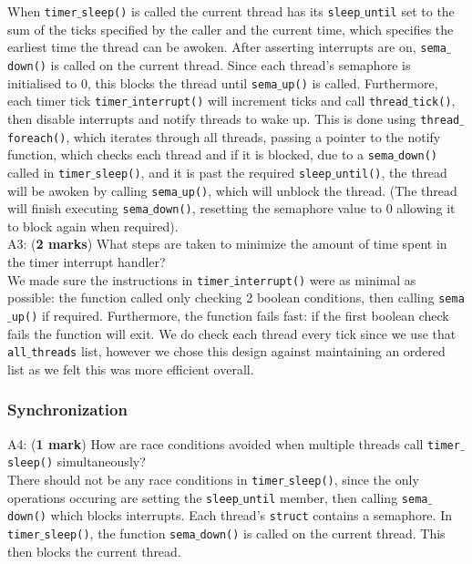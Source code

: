 \documentclass[a4paper,12pt]{article}
\begin{document}
When \texttt{timer$\_$sleep()} is called the current thread has its \texttt{sleep$\_$until} set to the sum of the ticks specified by the caller and the current time, which specifies the earliest time the thread can be awoken. After asserting interrupts are on, \texttt{sema$\_$down()} is called on the current thread. Since each thread's semaphore is initialised to 0, this blocks the thread until \texttt{sema$\_$up()} is called. Furthermore, each timer tick \texttt{timer$\_$interrupt()} will increment ticks and call \texttt{thread$\_$tick()}, then disable interrupts and notify threads to wake up. This is done using \texttt{thread$\_$foreach()}, which iterates through all threads, passing a pointer to the notify function, which checks each thread and if it is blocked, due to a \texttt{sema$\_$down()} called in \texttt{timer$\_$sleep()}, and it is past the required \texttt{sleep$\_$until()}, the thread will be awoken by calling \texttt{sema$\_$up()}, which will unblock the thread. (The thread will finish executing \texttt{sema$\_$down()}, resetting the semaphore value to 0 allowing it to block again when required). \\

A3: ({\bf 2 marks}) What steps are taken to minimize the amount of time spent in the timer interrupt handler? \\

We made sure the instructions in \texttt{timer$\_$interrupt()} were as minimal as possible: the function called only checking 2 boolean conditions, then calling \texttt{sema$\_$up()} if required. Furthermore, the function fails fast: if the first boolean check fails the function will exit. We do check each thread every tick since we use that \texttt{all$\_$threads} list, however we chose this design against maintaining an ordered list as we felt this was more efficient overall.

\subsubsection*{Synchronization}
A4: ({\bf 1 mark}) How are race conditions avoided when multiple threads call \texttt{timer$\_$sleep()} simultaneously? \\

There should not be any race conditions in \texttt{timer$\_$sleep()}, since the only operations occuring are setting the \texttt{sleep$\_$until} member, then calling \texttt{sema$\_$down()} which blocks interrupts. Each thread's \texttt{struct} contains a semaphore. In \texttt{timer$\_$sleep()}, the function \texttt{sema$\_$down()} is called on the current thread. This then blocks the current thread.
\end{document}
